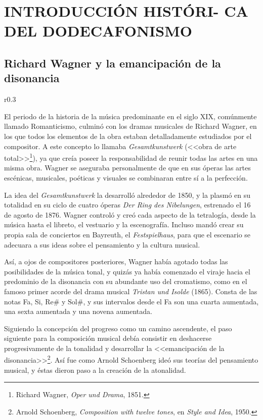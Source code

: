 	\chapter[INTRODUCCIÓN HISTÓRICA DEL DODECAFONISMO]{INTRODUCCIÓN HISTÓRI- CA DEL DODECAFONISMO}
	\section{Richard Wagner y la emancipación de la disonancia}
		\begin{wrapfigure}{r}{0.3\textwidth}
			\captionsetup{justification=centering, font=footnotesize}
			\vspace{-0.5cm}
		\end{wrapfigure}
		El periodo de la historia de la música predominante en el siglo XIX, comúnmente llamado Romanticismo, culminó con los dramas musicales de Richard Wagner, en los que todos los elementos de la obra estaban detalladamente estudiados por el compositor. A este concepto lo llamaba \emph{Gesamtkunstwerk} (<<obra de arte total>>\footnote{Richard Wagner, \emph{Oper und Drama}, 1851.}), ya que creía poseer la responsabilidad de reunir todas las artes en una misma obra. Wagner se aseguraba personalmente de que en sus óperas las artes escénicas, musicales, poéticas y visuales se combinaran entre sí a la perfección.
	
		La idea del \emph{Gesamtkunstwerk} la desarrolló alrededor de 1850, y la plasmó en su totalidad en su ciclo de cuatro óperas \emph{Der Ring des Nibelungen}, estrenado el 16 de agosto de 1876. Wagner controló y creó cada aspecto de la tetralogía, desde la música hasta el libreto, el vestuario y la escenografía. Incluso mandó crear su propia sala de conciertos en Bayreuth, el \emph{Festspielhaus}, para que el escenario se adecuara a sus ideas sobre el pensamiento y la cultura musical.
	
		Así, a ojos de compositores posteriores, Wagner había agotado todas las posibilidades de la música tonal, y quizás ya había comenzado el viraje hacia el predominio de la disonancia con su abundante uso del cromatismo, como en el famoso primer acorde del drama musical \emph{Tristan und Isolde} (1865). Consta de las notas Fa, Si, $\text{Re\#}$ y $\text{Sol\#}$, y sus intervalos desde el Fa son una cuarta aumentada, una sexta aumentada y una novena aumentada.
		
		Siguiendo la concepción del progreso como un camino ascendente, el paso siguiente para la composición musical debía consistir en deshacerse progresivamente de la tonalidad y desarrollar la <<emancipación de la disonancia>>\footnote{Arnold Schoenberg, \emph{Composition with twelve tones}, en \emph{Style and Idea}, 1950.}. Así fue como Arnold Schoenberg ideó sus teorías del pensamiento musical, y éstas dieron paso a la creación de la atonalidad. \cite{kinney}
	
